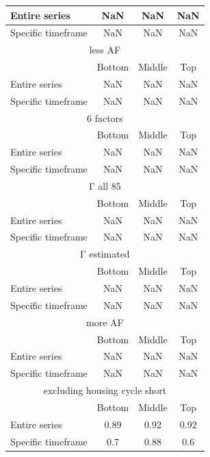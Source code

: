 \begin{table}[h!]
\begin{tabular}{|l|c|c|c|}
Entire series & NaN & NaN & NaN \\ \hline
Specific timeframe & NaN & NaN & NaN \\ \hline
\multicolumn{4}{|c|}{less AF} \\ \hline
& Bottom & Middle & Top \\ \hline
Entire series & NaN & NaN & NaN \\ \hline
Specific timeframe & NaN & NaN & NaN \\ \hline
\multicolumn{4}{|c|}{6 factors} \\ \hline
& Bottom & Middle & Top \\ \hline
Entire series & NaN & NaN & NaN \\ \hline
Specific timeframe & NaN & NaN & NaN \\ \hline
\multicolumn{4}{|c|}{Γ all 85} \\ \hline
& Bottom & Middle & Top \\ \hline
Entire series & NaN & NaN & NaN \\ \hline
Specific timeframe & NaN & NaN & NaN \\ \hline
\multicolumn{4}{|c|}{Γ estimated} \\ \hline
& Bottom & Middle & Top \\ \hline
Entire series & NaN & NaN & NaN \\ \hline
Specific timeframe & NaN & NaN & NaN \\ \hline
\multicolumn{4}{|c|}{more AF} \\ \hline
& Bottom & Middle & Top \\ \hline
Entire series & NaN & NaN & NaN \\ \hline
Specific timeframe & NaN & NaN & NaN \\ \hline
\multicolumn{4}{|c|}{excluding housing cycle short} \\ \hline
& Bottom & Middle & Top \\ \hline
Entire series & 0.89 & 0.92 & 0.92 \\ \hline
Specific timeframe & 0.7 & 0.88 & 0.6 \\ \hline
\end{tabular}
\end{table}
